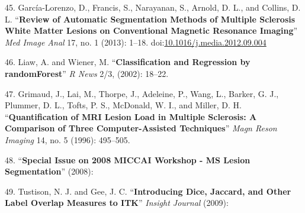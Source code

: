\documentclass[11pt,]{article}
\begin{document}
\hypertarget{ref-Garcia-Lorenzo:2013aa}{}
45. García-Lorenzo, D., Francis, S., Narayanan, S., Arnold, D. L., and
Collins, D. L. ``\textbf{Review of Automatic Segmentation Methods of
Multiple Sclerosis White Matter Lesions on Conventional Magnetic
Resonance Imaging}'' \emph{Med Image Anal} 17, no. 1 (2013): 1--18.
doi:\href{https://doi.org/10.1016/j.media.2012.09.004}{10.1016/j.media.2012.09.004}

\hypertarget{ref-liaw2002}{}
46. Liaw, A. and Wiener, M. ``\textbf{Classification and Regression by
randomForest}'' \emph{R News} 2/3, (2002): 18--22.

\hypertarget{ref-Grimaud:1996aa}{}
47. Grimaud, J., Lai, M., Thorpe, J., Adeleine, P., Wang, L., Barker, G.
J., Plummer, D. L., Tofts, P. S., McDonald, W. I., and Miller, D. H.
``\textbf{Quantification of MRI Lesion Load in Multiple Sclerosis: A
Comparison of Three Computer-Assisted Techniques}'' \emph{Magn Reson
Imaging} 14, no. 5 (1996): 495--505.

\hypertarget{ref-styner2008}{}
48. ``\textbf{Special Issue on 2008 MICCAI Workshop - MS Lesion
Segmentation}'' (2008):

\hypertarget{ref-tustison2009}{}
49. Tustison, N. J. and Gee, J. C. ``\textbf{Introducing Dice, Jaccard,
and Other Label Overlap Measures to ITK}'' \emph{Insight Journal}
(2009):
\end{document}

